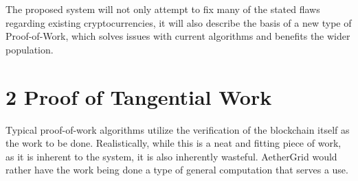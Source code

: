 \documentclass[12pt,english]{article}
\begin{document}
The proposed system will not only attempt to fix many of the stated flaws regarding existing cryptocurrencies, it will also describe the basis of a new type of Proof-of-Work, which solves issues with current algorithms and benefits the wider population.

\noindent \vspace{5mm} %
\section*{\huge{2 Proof of Tangential Work}}
\normalsize{} 



Typical proof-of-work algorithms utilize the verification of the blockchain itself as the work to be done. Realistically, while this is a neat and fitting piece of work, as it is inherent to the system, it is also inherently wasteful. AetherGrid would rather have the work being done a type of general computation that serves a use.
\end{document}
